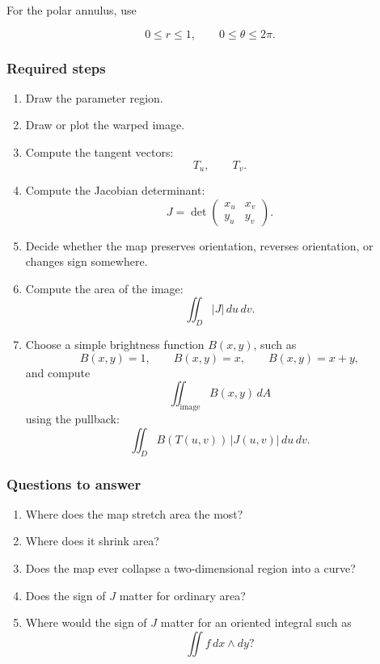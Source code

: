 For the polar annulus, use

\[
    0\le r\le1,
    \qquad
    0\le\theta\le2\pi.
\]

\subsubsection*{Required steps}

\begin{enumerate}
\item Draw the parameter region.

\item Draw or plot the warped image.

\item Compute the tangent vectors:
\[
    T_u,\qquad T_v.
\]

\item Compute the Jacobian determinant:
\[
    J=\det
    \begin{pmatrix}
    x_u & x_v\\
    y_u & y_v
    \end{pmatrix}.
\]

\item Decide whether the map preserves orientation, reverses orientation, or changes
sign somewhere.

\item Compute the area of the image:
\[
    \iint_D |J|\,du\,dv.
\]

\item Choose a simple brightness function \(B(x,y)\), such as
\[
    B(x,y)=1,\qquad B(x,y)=x,\qquad B(x,y)=x+y,
\]
and compute
\[
    \iint_{\text{image}}B(x,y)\,dA
\]
using the pullback:
\[
    \iint_D B(T(u,v))\,|J(u,v)|\,du\,dv.
\]
\end{enumerate}

\subsubsection*{Questions to answer}

\begin{enumerate}
\item Where does the map stretch area the most?

\item Where does it shrink area?

\item Does the map ever collapse a two-dimensional region into a curve?

\item Does the sign of \(J\) matter for ordinary area?

\item Where would the sign of \(J\) matter for an oriented integral such as
\[
    \iint f\,dx\wedge dy?
\]
\end{enumerate}

